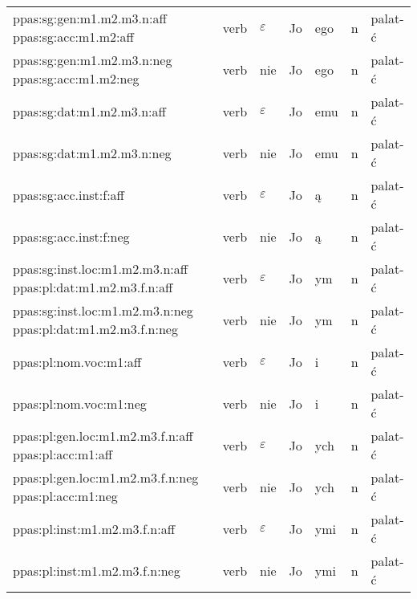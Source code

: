 \documentclass{article}
\begin{document}
\begin{longtable}{p{7cm}|l|l|l|l|l|l}
ppas:sg:gen:m1.m2.m3.n:aff ppas:sg:acc:m1.m2:aff & verb & $\varepsilon$ & Jo & ego & n & palat-ć\\
ppas:sg:gen:m1.m2.m3.n:neg ppas:sg:acc:m1.m2:neg & verb & nie & Jo & ego & n & palat-ć\\
ppas:sg:dat:m1.m2.m3.n:aff & verb & $\varepsilon$ & Jo & emu & n & palat-ć\\
ppas:sg:dat:m1.m2.m3.n:neg & verb & nie & Jo & emu & n & palat-ć\\
ppas:sg:acc.inst:f:aff & verb & $\varepsilon$ & Jo & ą & n & palat-ć\\
ppas:sg:acc.inst:f:neg & verb & nie & Jo & ą & n & palat-ć\\
ppas:sg:inst.loc:m1.m2.m3.n:aff ppas:pl:dat:m1.m2.m3.f.n:aff & verb & $\varepsilon$ & Jo & ym & n & palat-ć\\
ppas:sg:inst.loc:m1.m2.m3.n:neg ppas:pl:dat:m1.m2.m3.f.n:neg & verb & nie & Jo & ym & n & palat-ć\\
ppas:pl:nom.voc:m1:aff & verb & $\varepsilon$ & Jo & i & n & palat-ć\\
ppas:pl:nom.voc:m1:neg & verb & nie & Jo & i & n & palat-ć\\
ppas:pl:gen.loc:m1.m2.m3.f.n:aff ppas:pl:acc:m1:aff & verb & $\varepsilon$ & Jo & ych & n & palat-ć\\
ppas:pl:gen.loc:m1.m2.m3.f.n:neg ppas:pl:acc:m1:neg & verb & nie & Jo & ych & n & palat-ć\\
ppas:pl:inst:m1.m2.m3.f.n:aff & verb & $\varepsilon$ & Jo & ymi & n & palat-ć\\
ppas:pl:inst:m1.m2.m3.f.n:neg & verb & nie & Jo & ymi & n & palat-ć\\
\end{longtable}
\end{document}
